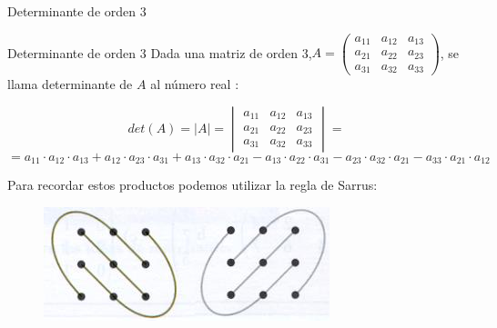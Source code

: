 \documentclass[9pt]{beamer}
\begin{document}
\begin{frame}{Determinante de orden 3}
\begin{alertblock}{Determinante de orden 3}
Dada una matriz de orden 3,$A=\begin{pmatrix}
a_{11}& a_{12} & a_{13} \\
a_{21} & a_{22} & a_{23} \\
a_{31}& a_{32} & a_{33}
\end{pmatrix}$, se llama determinante de $A$ al número real : 

\[ det(A)= |A|= \begin{vmatrix}
a_{11}& a_{12}  &a_{13} \\
a_{21} & a_{22}&a_{23}\\
a_{31} & a_{32}&a_{33}
\end{vmatrix} = \]
\[ =a_{11} \cdot a_{12} \cdot a_{13}+a_{12} \cdot a_{23} \cdot a_{31}+a_{13} \cdot a_{32} \cdot a_{21}-a_{13} \cdot a_{22} \cdot a_{31}-a_{23} \cdot a_{32} \cdot a_{21}-a_{33} \cdot a_{21} \cdot a_{12} \]
\end{alertblock}

Para recordar estos productos podemos utilizar la regla de Sarrus:
\begin{figure}[h]
\includegraphics[scale=0.7]{imagenes/sarrus.jpg}
\end{figure}

\end{frame}
\end{document}
